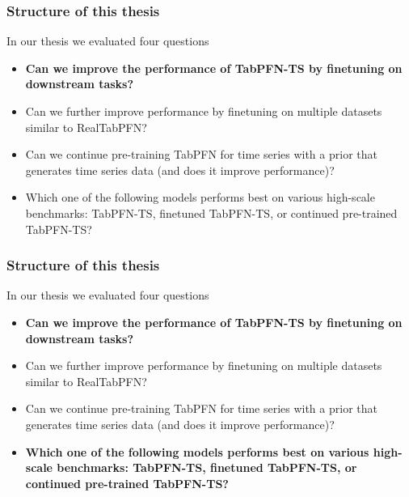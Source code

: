 \documentclass[t,aspectratio=169,svgnames]{beamer}
\begin{document}
\begin{frame}
\frametitle{Structure of this thesis}

In our thesis we evaluated four questions

\begin{itemize}
    \setlength{\itemsep}{10pt}
    \item \textbf{Can we improve the performance of TabPFN-TS by finetuning on downstream tasks?}

    \item Can we further improve performance by finetuning on multiple datasets similar to RealTabPFN?

    \item Can we continue pre-training TabPFN for time series with a prior that generates time series data (and does it improve performance)?

    \item Which one of the following models performs best on various high-scale benchmarks: TabPFN-TS, finetuned TabPFN-TS, or continued pre-trained TabPFN-TS?
\end{itemize}
\end{frame}

\begin{frame}
\frametitle{Structure of this thesis}

In our thesis we evaluated four questions

\begin{itemize}
    \setlength{\itemsep}{10pt}
    \item \textbf{Can we improve the performance of TabPFN-TS by finetuning on downstream tasks?}

    \item Can we further improve performance by finetuning on multiple datasets similar to RealTabPFN?

    \item Can we continue pre-training TabPFN for time series with a prior that generates time series data (and does it improve performance)?

    \item \textbf{Which one of the following models performs best on various high-scale benchmarks: TabPFN-TS, finetuned TabPFN-TS, or continued pre-trained TabPFN-TS?}
\end{itemize}
\end{frame}
\end{document}
